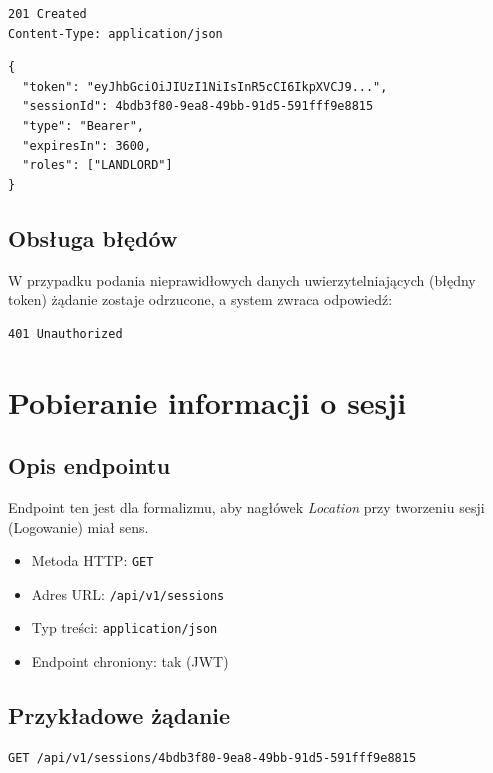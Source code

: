 \documentclass[11pt, a4paper]{article}
\begin{document}
\begin{lstlisting}[style=http,caption={Odpowiedź HTTP — sukces}]
201 Created
Content-Type: application/json

\end{lstlisting}

\begin{lstlisting}[style=json,caption={Ciało odpowiedzi — sukces}]
{
  "token": "eyJhbGciOiJIUzI1NiIsInR5cCI6IkpXVCJ9...",
  "sessionId": 4bdb3f80-9ea8-49bb-91d5-591fff9e8815
  "type": "Bearer",
  "expiresIn": 3600,
  "roles": ["LANDLORD"]
}
\end{lstlisting}

\subsection{Obsługa błędów}

W przypadku podania nieprawidłowych danych uwierzytelniających (błędny token) żądanie zostaje odrzucone, a system zwraca odpowiedź:

\begin{lstlisting}[style=http,caption={Odpowiedź HTTP — błędna autoryzacja}]
401 Unauthorized
\end{lstlisting}
\section{Pobieranie informacji o sesji}

\subsection{Opis endpointu}
Endpoint ten jest dla formalizmu, aby nagłówek \textit{Location}
przy tworzeniu sesji (Logowanie) miał sens.

\begin{itemize}
    \item Metoda HTTP: \texttt{GET}
    \item Adres URL: \texttt{/api/v1/sessions}
    \item Typ treści: \texttt{application/json}
    \item Endpoint chroniony: tak (JWT)
\end{itemize}

\subsection{Przykładowe żądanie}

\begin{lstlisting}[style=http,caption={Przykładowe żądanie logowania}]
GET /api/v1/sessions/4bdb3f80-9ea8-49bb-91d5-591fff9e8815
\end{lstlisting}
\end{document}
